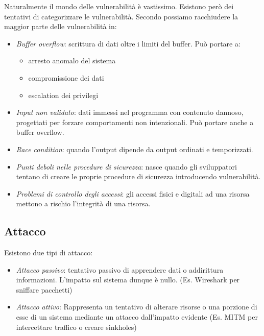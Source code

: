 \documentclass[14pt]{extreport}
\begin{document}
Naturalmente il mondo delle vulnerabilità è vastissimo. Esistono però dei tentativi di categorizzare le vulnerabilità. Secondo \cite{cisco} possiamo racchiudere la maggior parte delle vulnerabilità in:




\begin{itemize}
    \item \textit{Buffer overflow}: scrittura di dati oltre i limiti del buffer. Può portare a:
    \begin{itemize}
        \item arresto anomalo del sistema
        \item compromissione dei dati
        \item escalation dei privilegi
    \end{itemize}
    
    
    \item \textit{Input non validato}: dati immessi nel programma con contenuto dannoso, progettati per forzare comportamenti non intenzionali. Può portare anche a buffer overflow.
    
    \item \textit{Race condition}: quando l'output dipende da output ordinati e temporizzati.
    
    \item \textit{Punti deboli nelle procedure di sicurezza}: nasce quando gli sviluppatori tentano di creare le proprie procedure di sicurezza introducendo vulnerabilità.
    
    \item \textit{Problemi di controllo degli accessi}: gli accessi fisici e digitali ad una risorsa mettono a rischio l'integrità di una risorsa.
\end{itemize}





\subsection{Attacco}
Esistono due tipi di attacco:

\begin{itemize}
    \item \textit{Attacco passivo}: tentativo passivo di apprendere dati o addirittura informazioni. L'impatto sul sistema dunque è nullo. (Es. Wireshark per sniffare pacchetti)
    \item \textit{Attacco attivo}: Rappresenta un tentativo di alterare risorse o una porzione di esse di un sistema mediante un attacco dall'impatto evidente (Es. MITM per intercettare traffico o creare sinkholes)
\end{itemize}
\end{document}
